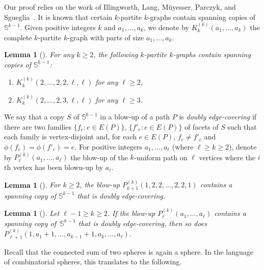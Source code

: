 \documentclass[12pt,reqno]{amsart}
\theoremstyle{plain}
\newtheorem{lemma}[theorem]{Lemma}
\theoremstyle{definition}
\numberwithin{equation}{section}
\newcommand{\bS}{\mathbb{S}}
\begin{document}
	Our proof relies on the work of Illingworth, Lang, Müyesser, Parczyk, and Sgueglia~\cite{ILM+24}.
	It is known that certain $k$-partite $k$-graphs contain spanning copies of $\bS^{k - 1}$.
	Given positive integers $k$ and $a_1, \dotsc, a_k$, we denote by \emph{$K_k^{(k)}(a_1, \dotsc, a_k)$} the complete $k$-partite $k$-graph with parts of size $a_1, \dotsc, a_k$.
	
	\begin{lemma}[{\cite[Lemma 5.4]{ILM+24}}]\label{lem:partitesphere}
		For any $k \geq 2$, the following $k$-partite $k$-graphs contain spanning copies of $\bS^{k - 1}$\textup{:}
		\begin{enumerate}[label = \textup{(}\alph*\textup{)}]
			\item \label{itm:partitesphere-a} $K_k^{(k)}(2, \dotsc, 2, 2, \ell, \ell)$ for any $\ell \geq 2$,
			\item \label{itm:partitesphere-b} $K_k^{(k)}(2, \dotsc, 2, 3, \ell, \ell)$ for any $\ell \geq 3$.
		\end{enumerate}
	\end{lemma}
	
	We say that a copy $S$ of $\bS^{k - 1}$ in a blow-up of a path $P$ is \emph{doubly edge-covering} if there are two families $\{f_e \colon e \in E(P)\}$, $\{f'_e \colon e \in E(P)\}$ of facets of $S$ such that each family is vertex-disjoint and, for each $e \in E(P)$, $f_e \neq f'_e$ and $\phi(f_e) = \phi(f'_e) = e$. For positive integers $a_1, \dotsc, a_\ell$ (where $\ell \geq k \geq 2$), denote by \emph{$P_\ell^{(k)}(a_1, \dotsc, a_\ell)$} the blow-up of the $k$-uniform path on $\ell$ vertices where the $i$th vertex has been blown-up by $a_i$.
	
	\begin{lemma}[{\cite[Lemma 5.5]{ILM+24}}]\label{lem:thin-path}
		For $k\geq 2$, the blow-up $P_{k + 1}^{(k)}(1, 2, 2, \dotsc, 2, 2, 1)$ contains a spanning copy of $\bS^{k - 1}$ that is doubly edge-covering.
	\end{lemma}
	
	\begin{lemma}[{\cite[Lemma 5.6]{ILM+24}}]\label{lem:growing-path}
		Let $\ell - 1 \geq k \geq 2$.
		If the blow-up  $P_\ell^{(k)}(a_1, \dotsc, a_\ell)$ contains a spanning copy of~$\bS^{k - 1}$ that is doubly edge-covering, then so does $P_{\ell + 1}^{(k)}(1, a_1 + 1, \dotsc, a_{k - 1} + 1, a_k, \dotsc, a_\ell)$.
	\end{lemma}
	
	Recall that the connected sum of two spheres is again a sphere.
	In the language of combinatorial spheres, this translates to the following.
	
\end{document}

